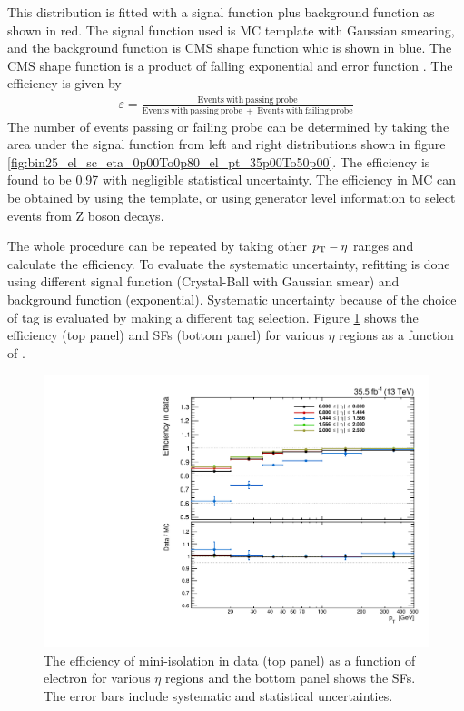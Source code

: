 This distribution is fitted with a signal function plus background function as shown in red. The signal function used is MC template with 
Gaussian smearing, and the background function is CMS shape function whic is shown in blue.
The CMS shape function is a product of falling exponential and error function \cite{Meyer:2239058}. The 
efficiency is given by
\begin{eqnarray}
\varepsilon = \mathrm{\frac{Events\ with\ passing\ probe}{Events\ with\ passing\ probe\ +\ Events\ with\ failing\ probe}}
\end{eqnarray}
The number of events passing or failing probe can be determined by taking the area under the signal function from left and right
distributions shown in figure \ref{fig:bin25_el_sc_eta_0p00To0p80_el_pt_35p00To50p00}. The efficiency is found to be 0.97 
with negligible statistical uncertainty. The efficiency in MC can be obtained by using the template, or using generator level information
to select events from Z boson decays.

The whole procedure can be repeated by taking other $p_{\mathrm{T}}-\eta$ ranges and calculate the efficiency. To evaluate the systematic 
uncertainty, refitting is done using different signal function (Crystal-Ball with Gaussian smear) and background function (exponential). 
Systematic uncertainty because of the choice of tag is evaluated by making a different tag selection. Figure \ref{fig:MiniIsoSF} shows the 
efficiency (top panel) and SFs (bottom panel) for various $\eta$ regions as a function of \pt.
\begin{figure}[h!]
\centering
\includegraphics[width=0.6\linewidth]{../Figures/Chap2/MiniIsoSF}
\captionsetup{width=.9\linewidth}
\caption[Mini-isolation efficiency and SF]{The efficiency of mini-isolation in data (top panel) as a function of electron \pt for various $\eta$ regions and the bottom panel shows the SFs. The error bars include systematic and statistical uncertainties.}
\label{fig:MiniIsoSF}
\end{figure}

